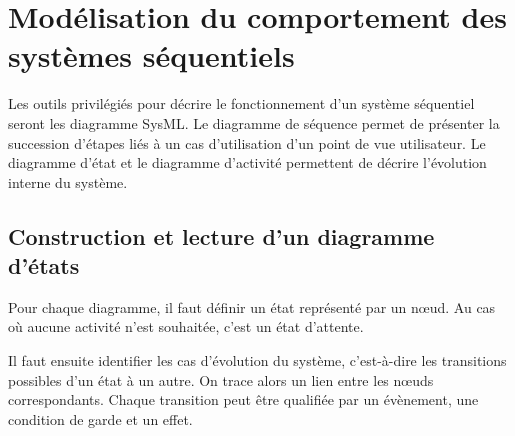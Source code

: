 \documentclass[10pt,fleqn]{article} %
\begin{document}
%
%

\section{Modélisation du comportement des systèmes séquentiels \cite{1}}

Les outils privilégiés pour décrire le fonctionnement d'un système séquentiel seront les diagramme SysML. Le diagramme de séquence permet de présenter la succession d'étapes liés à un cas d'utilisation d'un point de vue utilisateur. Le diagramme d'état et le diagramme d'activité permettent de décrire l'évolution interne du système. 
                           

\subsection{Construction et lecture d'un diagramme d'états}

\begin{methode}
  Pour chaque diagramme, il faut définir un état représenté par un n\oe{}ud. Au cas où
aucune activité n’est souhaitée, c’est un état d’attente.

Il faut ensuite identifier les cas d’évolution du système, c'est-à-dire les transitions
possibles d’un état à un autre. On trace alors un lien entre les n\oe{}uds
correspondants. Chaque transition peut être qualifiée par un évènement, une
condition de garde et un effet.
\end{methode}
\end{document}
